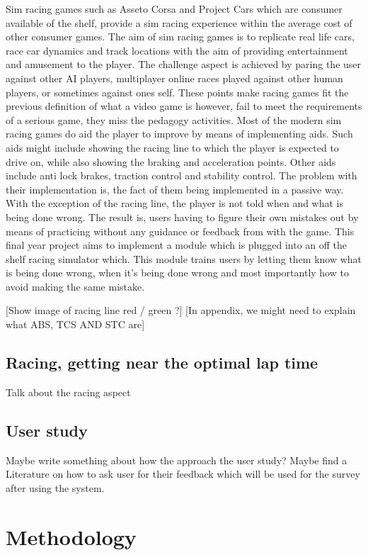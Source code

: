 \documentclass{article}
\begin{document}
Sim racing games such as Asseto Corsa and Project Cars which are consumer available of the shelf, provide a sim racing experience within the average cost of other consumer games. The aim of sim racing games is to replicate real life cars, race car dynamics and track locations with the aim of providing entertainment and amusement to the player. The challenge aspect is achieved by paring the user against other AI players, multiplayer online races played against other human players, or sometimes against ones self. These points make racing games fit the previous definition of what a video game is however, fail to meet the requirements of a serious game, they miss the pedagogy activities. Most of the modern sim racing games do aid the player to improve by means of implementing aids. Such aids might include showing the racing line to which the player is expected to drive on, while also showing the braking and acceleration points. Other aids include anti lock brakes, traction control and stability control. The problem with their implementation is, the fact of them being implemented in a passive way. With the exception of the racing line, the player is not told when and what is being done wrong. The result is, users having to figure their own mistakes out by means of practicing without any guidance or feedback from with the game. This final year project aims to implement a module which is plugged into an off the shelf racing simulator which. This module trains users by letting them know what is being done wrong, when it's being done wrong and most importantly how to avoid making the same mistake.

[Show image of racing line red / green ?]
[In appendix, we might need to explain what ABS, TCS AND STC are]

\subsection{Racing, getting near the optimal lap time}
Talk about the racing aspect

\subsection{User study}
Maybe write something about how the approach the user study? Maybe find a Literature on how to ask user for their feedback which will be used for the survey after using the system.

\newpage
\section{Methodology}

\newpage
{}

\end{document}
